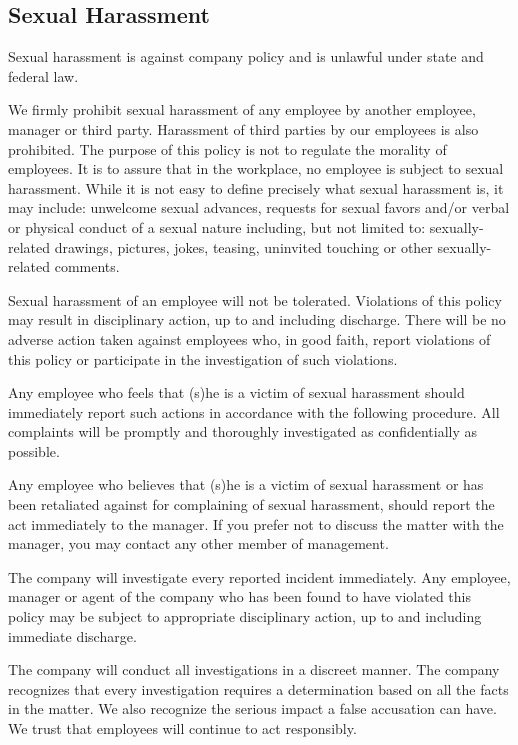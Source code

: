 \documentclass{book}
\begin{document}
\subsection{Sexual Harassment}

Sexual harassment is against company policy and is unlawful under state and federal law.

We firmly prohibit sexual harassment of any employee by another employee, manager or third party. Harassment of third parties by our employees is also prohibited. The purpose of this policy is not to regulate the morality of employees. It is to assure that in the workplace, no employee is subject to sexual harassment. While it is not easy to define precisely what sexual harassment is, it may include: unwelcome sexual advances, requests for sexual favors and/or verbal or physical conduct of a sexual nature including, but not limited to: sexually-related drawings, pictures, jokes, teasing, uninvited touching or other sexually-related comments.

Sexual harassment of an employee will not be tolerated. Violations of this policy may result in disciplinary action, up to and including discharge. There will be no adverse action taken against employees who, in good faith, report violations of this policy or participate in the investigation of such violations.

Any employee who feels that (s)he is a victim of sexual harassment should immediately report such actions in accordance with the following procedure. All complaints will be promptly and thoroughly investigated as confidentially as possible.

Any employee who believes that (s)he is a victim of sexual harassment or has been retaliated against for complaining of sexual harassment, should report the act immediately to the manager. If you prefer not to discuss the matter with the manager, you may contact any other member of management.

The company will investigate every reported incident immediately. Any employee, manager or agent of the company who has been found to have violated this policy may be subject to appropriate disciplinary action, up to and including immediate discharge.

The company will conduct all investigations in a discreet manner. The company recognizes that every investigation requires a determination based on all the facts in the matter. We also recognize the serious impact a false accusation can have. We trust that employees will continue to act responsibly.
\end{document}

